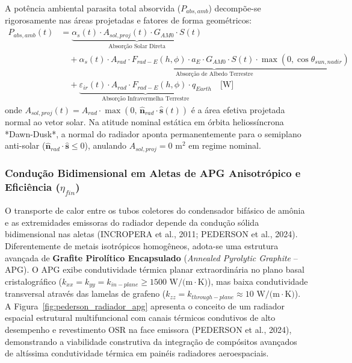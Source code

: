 A potência ambiental parasita total absorvida ($P_{abs,amb}$) decompõe-se rigorosamente nas áreas projetadas e fatores de forma geométricos:
\begin{align}
    P_{abs,amb}(t) &= \underbrace{\alpha_s(t) \cdot A_{sol,proj}(t) \cdot G_{AM0} \cdot S(t)}_{\text{Absorção Solar Direta}} \nonumber \\
    &\quad + \underbrace{\alpha_s(t) \cdot A_{rad} \cdot F_{rad-E}(h, \phi) \cdot a_E \cdot G_{AM0} \cdot S(t) \cdot \max(0, \cos \theta_{sun,nadir})}_{\text{Absorção de Albedo Terrestre}} \nonumber \\
    &\quad + \underbrace{\varepsilon_{ir}(t) \cdot A_{rad} \cdot F_{rad-E}(h, \phi) \cdot q_{Earth}}_{\text{Absorção Infravermelha Terrestre}} \quad \text{[W]}
    \label{eq:potencia_parasita_absorvida}
\end{align}
onde $A_{sol,proj}(t) = A_{rad} \cdot \max(0, \, \hat{\mathbf{n}}_{rad} \cdot \hat{\mathbf{s}}(t))$ é a área efetiva projetada normal ao vetor solar. Na atitude nominal estática em órbita heliossíncrona *Dawn-Dusk*, a normal do radiador aponta permanentemente para o semiplano anti-solar ($\hat{\mathbf{n}}_{rad} \cdot \hat{\mathbf{s}} \le 0$), anulando $A_{sol,proj} = 0\text{ m}^2$ em regime nominal.

\subsubsection{Condução Bidimensional em Aletas de APG Anisotrópico e Eficiência \texorpdfstring{($\eta_{fin}$)}{(eta-fin)}}

O transporte de calor entre os tubos coletores do condensador bifásico de amônia e as extremidades emissoras do radiador depende da condução sólida bidimensional nas aletas (INCROPERA et al., 2011; PEDERSON et al., 2024). Diferentemente de metais isotrópicos homogêneos, adota-se uma estrutura avançada de \textbf{Grafite Pirolítico Encapsulado} (\textit{Annealed Pyrolytic Graphite} -- APG). O APG exibe condutividade térmica planar extraordinária no plano basal cristalográfico ($k_{xx} = k_{yy} = k_{in-plane} \ge 1500\text{ W/(m}\cdot\text{K)}$), mas baixa condutividade transversal através das lamelas de grafeno ($k_{zz} = k_{through-plane} \approx 10\text{ W/(m}\cdot\text{K)}$). A Figura~\ref{fig:pederson_radiador_apg} apresenta o conceito de um radiador espacial estrutural multifuncional com canais térmicos condutivos de alto desempenho e revestimento OSR na face emissora (PEDERSON et al., 2024), demonstrando a viabilidade construtiva da integração de compósitos avançados de altíssima condutividade térmica em painéis radiadores aeroespaciais.

